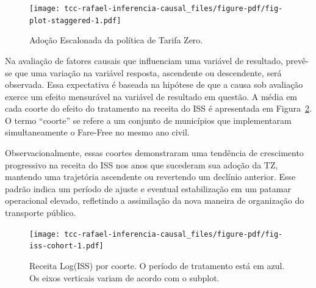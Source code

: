 \documentclass[12pt, a4paper, twoside]{article}
\numberwithin{equation}{subsection} %
\begin{document}
\begin{figure}[H]

{\centering \texttt{[image: tcc-rafael-inferencia-causal\_files/figure-pdf/fig-plot-staggered-1.pdf]}

}

\caption{\label{fig-plot-staggered}Adoção Escalonada da política de
Tarifa Zero.}

\end{figure}

Na avaliação de fatores causais que influenciam uma variável de
resultado, prevê-se que uma variação na variável resposta, ascendente ou
descendente, será observada. Essa expectativa é baseada na hipótese de
que a causa sob avaliação exerce um efeito mensurável na variável de
resultado em questão. A média em cada coorte do efeito do tratamento na
receita do ISS é apresentada em Figura~\ref{fig-iss-cohort}. O termo
``coorte'' se refere a um conjunto de municípios que implementaram
simultaneamente o Fare-Free no mesmo ano civil.

Observacionalmente, essas coortes demonstraram uma tendência de
crescimento progressivo na receita do ISS nos anos que sucederam sua
adoção da TZ, mantendo uma trajetória ascendente ou revertendo um
declínio anterior. Esse padrão indica um período de ajuste e eventual
estabilização em um patamar operacional elevado, refletindo a
assimilação da nova maneira de organização do transporte público.

\begin{figure}[H]

{\centering \texttt{[image: tcc-rafael-inferencia-causal\_files/figure-pdf/fig-iss-cohort-1.pdf]}

}

\caption{\label{fig-iss-cohort}Receita Log(ISS) por coorte. O período de
tratamento está em azul. Os eixos verticais variam de acordo com o
subplot.}

\end{figure}
\end{document}
